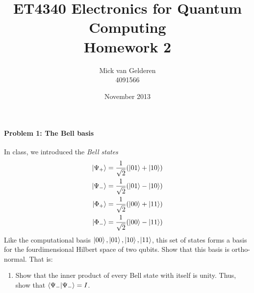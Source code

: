 \documentclass{article}
\title{ET4340 Electronics for Quantum Computing\\Homework 2}
\author{
    Mick van Gelderen\\4091566
}
\date{November 2013}
\newcommand{\rsqrt}[1]{\ensuremath{\frac{1}{\sqrt{#1}}}}
\begin{document}
\maketitle

\paragraph{Problem 1: The Bell basis}

In class, we introduced the \emph{Bell states}
\begin{align*}
    \ket{\Psi_+} &= \rsqrt{2} (\ket{01} + \ket{10}) \\
    \ket{\Psi_-} &= \rsqrt{2} (\ket{01} - \ket{10}) \\
    \ket{\Phi_+} &= \rsqrt{2} (\ket{00} + \ket{11}) \\
    \ket{\Phi_-} &= \rsqrt{2} (\ket{00} - \ket{11}) \\
\end{align*}
Like the computational basis ${\ket{00}, \ket{01}, \ket{10}, \ket{11}}$, this set of states forms a basis for the fourdimensional Hilbert space of two qubits. Show that this basis is ortho-normal. That is:
\begin{enumerate}
    \item Show that the inner product of every Bell state with itself is unity. Thus, show that $\braket{\Psi_-|\Psi_-} = I$.
\end{enumerate}
\end{document}
